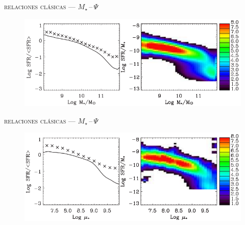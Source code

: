 \documentclass[xcolor=dvipsnames,4pt,hyperref={colorlinks,citecolor=black,linkcolor=black,urlcolor=black}]{beamer}
\begin{document}
\begin{frame}{\textsc{relaciones clásicas --- $M_\star\,$--$\,\Psi$}}
\begin{figure}
\includegraphics[scale=1]{img/brinchmann2004-24}
\end{figure}
\end{frame}

\begin{frame}{\textsc{relaciones clásicas --- $M_\star\,$--$\,\Psi$}}
\begin{figure}
\includegraphics[scale=1]{img/brinchmann2004-25}
\end{figure}
\end{frame}
\end{document}
